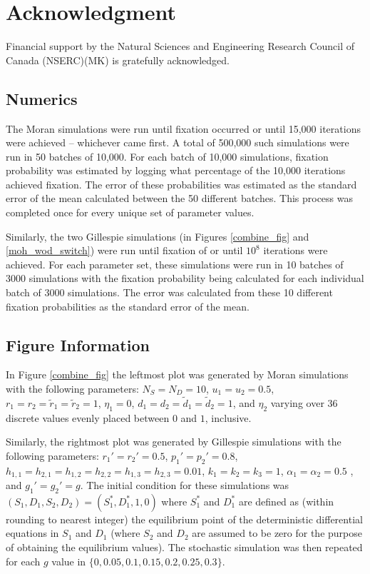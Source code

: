 \documentclass[12pt]{article}
\begin{document}
\section{Acknowledgment}
Financial support by the Natural Sciences and Engineering Research Council of Canada (NSERC)(MK) is gratefully acknowledged. 

\begin{appendices}

\section{Numerics}\label{exp}

The Moran simulations were run until fixation occurred or until 15,000 iterations were achieved -- whichever came first. A total of 500,000 such simulations were run in 50 batches of 10,000. For each batch of 10,000 simulations, fixation probability was estimated by logging what percentage of the 10,000 iterations achieved fixation. The error of these probabilities was estimated as the standard error of the mean calculated between the 50 different batches.  This process was completed once for every unique set of parameter values. 

Similarly, the two Gillespie simulations (in Figures \ref{combine_fig} and \ref{moh_wod_switch}) were run until fixation of or until $10^8$ iterations were achieved. For each parameter set, these simulations were run in 10 batches of 3000 simulations with the fixation probability being calculated for each individual batch of 3000 simulations. The error was calculated from these 10 different fixation probabilities as the standard error of the mean.

\subsection{Figure Information}
In Figure \ref{combine_fig} the leftmost plot was generated by Moran simulations with the following parameters: $N_S=N_D=10$, $u_1=u_2=0.5$, $r_1=r_2=\tilde{r}_1=\tilde{r}_2=1$, $\eta_1=0$, $d_1=d_2=\tilde{d}_1=\tilde{d}_2=1$, and $\eta_2$ varying over 36 discrete values evenly placed between $0$ and $1$, inclusive.

Similarly, the rightmost plot was generated by Gillespie simulations with the following parameters: $r_1'=r_2'=0.5$, $p_1'=p_2'=0.8$, $h_{1,1}=h_{2,1}=h_{1,2}=h_{2,2}=h_{1,3}=h_{2,3}=0.01$, $k_1=k_2=k_3=1$, $\alpha_1=\alpha_2=0.5$
, and $g_1'=g_2'=g$. The initial condition for these simulations was $(S_1, D_1, S_2, D_2) = (S_1^\ast, D_1^\ast, 1, 0)$ where $S_1^\ast$ and $D_1^\ast$ are defined as (within rounding to nearest integer) the equilibrium point of the deterministic differential equations in $S_1$ and $D_1$ (where $S_2$ and $D_2$ are assumed to be zero for the purpose of obtaining the equilibrium values). The stochastic simulation was then repeated for each $g$ value in $\{0, 0.05, 0.1, 0.15, 0.2, 0.25, 0.3\}$. 


\end{appendices}
\end{document}
